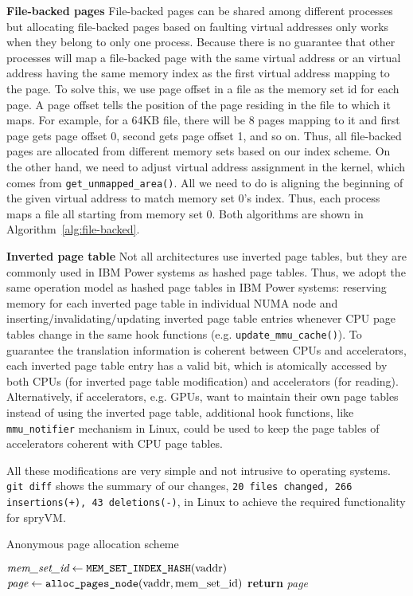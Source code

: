 \textbf{File-backed pages} File-backed pages can be shared among different processes but
allocating file-backed pages based on faulting virtual addresses only works when they belong to
only one process. Because there is no guarantee that other processes will map a file-backed page
with the same virtual address or an virtual address having the same memory index as the first
virtual address mapping to the page. To solve this, we use page offset in a file as the memory set
id for each page. A page offset tells the position of the page residing in the file to which it maps.
For example, for a 64KB file, there will be 8 pages mapping to it and first page gets page offset
0, second gets page offset 1, and so on. Thus, all file-backed pages are allocated from different
memory sets based on our index scheme. On the other hand, we need to adjust virtual address 
assignment in the kernel, which comes from \verb|get_unmapped_area()|. All we need to do
is aligning the beginning of the given virtual address to match memory set 0's index. Thus,
each process maps a file all starting from memory set 0. Both algorithms are shown in 
Algorithm~\ref{alg:file-backed}.


\textbf{Inverted page table} Not all architectures use inverted page tables, but they are commonly used in IBM Power systems as hashed page tables. Thus, we adopt the same operation model as hashed page tables in IBM Power systems: reserving memory for each inverted page table in individual NUMA node and inserting/invalidating/updating inverted page table entries whenever CPU page tables change in the same hook functions (e.g. \verb|update_mmu_cache()|). To guarantee the translation information is coherent between CPUs and accelerators, each inverted page table entry has a valid bit, which is atomically accessed by both CPUs (for inverted page table modification) and accelerators (for reading). Alternatively, if accelerators, e.g. GPUs, want to maintain their own page tables instead of using the inverted page table, additional hook functions, like  \verb|mmu_notifier| mechanism in Linux, could be used to keep the page tables of accelerators coherent with CPU page tables.

All these modifications are very simple and not intrusive to operating systems. \verb|git diff| shows the summary of our changes, \texttt{20 files changed, 266 insertions(+), 43 deletions(-)}, in Linux to achieve the required functionality for spryVM. 

\begin{algorithm}
  \caption{Anonymous page allocation scheme}\label{alg:anonymous}
  \begin{algorithmic}[1]
    \State $\textit{mem\_set\_id} \gets \verb|MEM_SET_INDEX_HASH|(\mbox{vaddr})$
    \State $\textit{page} \gets \verb|alloc_pages_node|(\mbox{vaddr}, \mbox{mem\_set\_id})$
    \State \textbf{return} \textit{page}
    \EndProcedure
  \end{algorithmic}
\end{algorithm}

